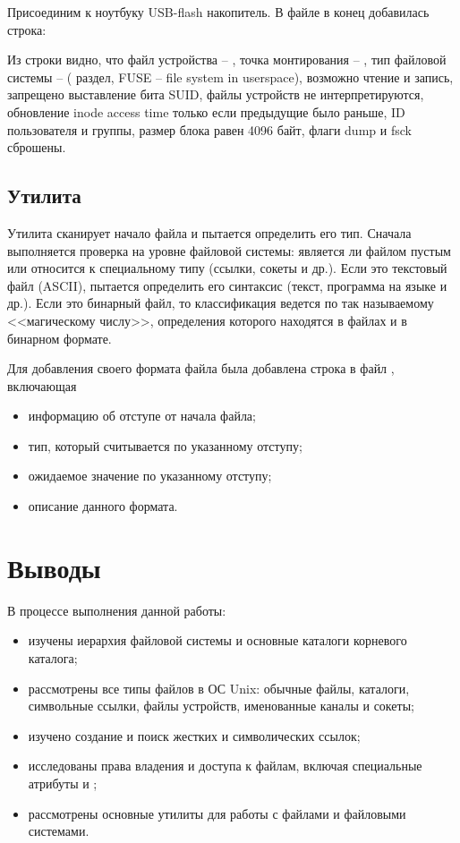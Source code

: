 Присоединим к ноутбуку USB-flash накопитель. В файле  в конец добавилась строка:


Из строки видно, что файл устройства -- , точка монтирования -- , тип файловой системы --  ( раздел, FUSE -- file system in userspace), возможно чтение и запись, запрещено выставление бита SUID, файлы устройств не интерпретируются, обновление inode access time только если предыдущие было раньше, ID пользователя и группы, размер блока равен 4096 байт, флаги dump и fsck сброшены.

\subsection{Утилита }

Утилита  сканирует начало файла и пытается определить его тип. Сначала выполняется проверка на уровне файловой системы: является ли файлом пустым или относится к специальному типу (ссылки, сокеты и др.). Если это текстовый файл (ASCII),  пытается определить его синтаксис (текст, программа на языке  и др.). Если это бинарный файл, то классификация ведется по так называемому <<магическому числу>>, определения которого находятся в файлах  и  в бинарном формате.



Для добавления своего формата файла была добавлена строка в файл , включающая 
\begin{itemize}
	\item информацию об отступе от начала файла;
	\item тип, который считывается по указанному отступу;
	\item ожидаемое значение по указанному отступу;
	\item описание данного формата.
\end{itemize}


\section{Выводы}

В процессе выполнения данной работы:
\begin{itemize}
	\item изучены иерархия файловой системы и основные каталоги корневого каталога;
	\item рассмотрены все типы файлов в ОС Unix: обычные файлы, каталоги, символьные ссылки, файлы устройств, именованные каналы и сокеты;
	\item изучено создание и поиск жестких и символических ссылок;
	\item исследованы права владения и доступа к файлам, включая специальные атрибуты  и ;
	\item рассмотрены основные утилиты для работы с файлами и файловыми системами.
\end{itemize}

